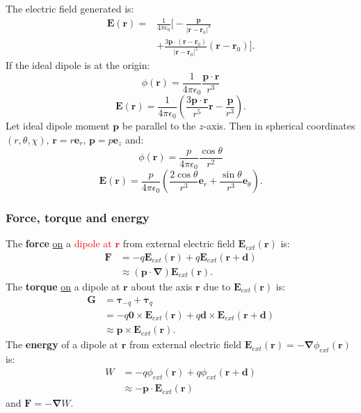 \documentclass{article}
\newcommand{\vc}[1]{\boldsymbol{#1}}
\begin{document}
\begin{multicols*}{3}
The electric field generated is:
\begin{align*}
    \vc{E}(\vc{r})
    =&\frac{1}{4\pi\epsilon_0}\bigg[
    -\frac{\vc{p}}{|\vc{r}-\vc{r}_0|^3} \\
    &+\frac{3\vc{p}\cdot(\vc{r}-\vc{r}_0)}{|\vc{r}-\vc{r}_0|^5}
    (\vc{r}-\vc{r}_0)\bigg].
\end{align*}
If the ideal dipole is at the origin:
$$\phi(\vc{r})=\frac{1}{4\pi\epsilon_0}
\frac{\vc{p}\cdot\vc{r}}{r^3}$$
$$\vc{E}(\vc{r})=\frac{1}{4\pi\epsilon_0}
\left(\frac{3\vc{p}\cdot\vc{r}}{r^5}\vc{r}
-\frac{\vc{p}}{r^3}\right).$$
Let ideal dipole moment $\vc{p}$ be parallel to the $z$-axis.
Then in spherical coordinates $(r,\theta,\chi)$,
$\vc{r}=r\vc{e}_r$, $\vc{p}=p\vc{e}_z$ and:
$$\phi(\vc{r})=\frac{p}{4\pi\epsilon_0}\frac{\cos\theta}{r^2}$$
$$\vc{E}(\vc{r})=\frac{p}{4\pi\epsilon_0}\left(
\frac{2\cos\theta}{r^3}\vc{e}_r+\frac{\sin\theta}{r^3}
\vc{e}_{\theta}\right).$$

\subsubsection*{Force, torque and energy}
The \textbf{force} \underline{on} a
\textcolor{red}{dipole at $\vc{r}$}
from external electric field $\vc{E}_{ext}(\vc{r})$ is:
\begin{align*}
    \vc{F}
    &=-q\vc{E}_{ext}(\vc{r})+q\vc{E}_{ext}(\vc{r}+\vc{d}) \\
    &\approx(\vc{p}\cdot\vc{\nabla})\vc{E}_{ext}(\vc{r}).
\end{align*}
The \textbf{torque} \underline{on} a dipole at $\vc{r}$
about the axis $\vc{r}$ due to $\vc{E}_{ext}(\vc{r})$ is:
\begin{align*}
    \vc{G}
    &=\vc{\tau}_{-q}+\vc{\tau}_{q} \\
    &=-q\vc{0}\times\vc{E}_{ext}(\vc{r})
    +q\vc{d}\times\vc{E}_{ext}(\vc{r}+\vc{d}) \\
    &\approx\vc{p}\times\vc{E}_{ext}(\vc{r}).
\end{align*}
The \textbf{energy} of a dipole at $\vc{r}$
from external electric field 
$\vc{E}_{ext}(\vc{r})=-\vc{\nabla}\phi_{ext}(\vc{r})$ is:
\begin{align*}
    W
    &=-q\phi_{ext}(\vc{r})+q\phi_{ext}(\vc{r}+\vc{d}) \\
    &\approx -\vc{p}\cdot\vc{E}_{ext}(\vc{r})
\end{align*}
and $\vc{F}=-\vc{\nabla}W$.


\end{multicols*}
\end{document}

